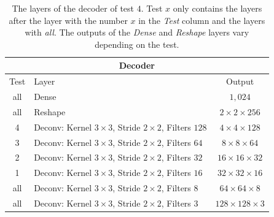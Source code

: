 \vspace{-4em}
\begin{center}
    \begin{table}[H]
        \centering
        \begin{tabular}{ | c | l | c | }
            \multicolumn{3}{c}{Decoder} \\ \hline
            Test &Layer & Output\\ \hline
            all &Dense                                                            & $1,024$                   \\
            all &Reshape                                                          & $2\times 2\times    256$  \\
            4   &Deconv: Kernel $3\times3$, Stride $2\times2$, Filters $128$      & $4\times 4\times    128$  \\  
            3   &Deconv: Kernel $3\times3$, Stride $2\times2$, Filters $64 $      & $8\times 8\times    64 $  \\
            2   &Deconv: Kernel $3\times3$, Stride $2\times2$, Filters $32 $      & $16\times 16\times  32 $  \\
            1   &Deconv: Kernel $3\times3$, Stride $2\times2$, Filters $16 $      & $32\times 32\times  16 $  \\
            all &Deconv: Kernel $3\times3$, Stride $2\times2$, Filters $8  $      & $64\times 64\times  8  $  \\
            all &Deconv: Kernel $3\times3$, Stride $2\times2$, Filters $3  $      & $128\times 128\times3  $  \\
            \hline
        \end{tabular} 
        \caption{The layers of the decoder of test $4$. 
        Test $x$ only contains the layers after the layer with the number
        $x$ in the \textit{Test} column and the layers with \textit{all}.
        The outputs of the \textit{Dense} and \textit{Reshape}
        layers vary depending on the test.}
    \end{table}
\end{center}

